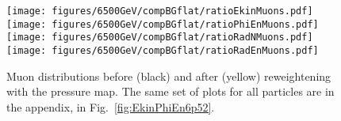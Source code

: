 \begin{figure}
\begin{center}

  \texttt{[image: figures/6500GeV/compBGflat/ratioEkinMuons.pdf]}
  \texttt{[image: figures/6500GeV/compBGflat/ratioPhiEnMuons.pdf]}
  \texttt{[image: figures/6500GeV/compBGflat/ratioRadNMuons.pdf]}
  \texttt{[image: figures/6500GeV/compBGflat/ratioRadEnMuons.pdf]}
\end{center}
\vspace{-0.6cm}
 \caption{Muon distributions before (black) and after (yellow) reweightening with the pressure map. The same set of plots for all particles are in the appendix, in Fig.~\ref{fig:EkinPhiEn6p52}.
  \label{fig:EkinPhiEn6p5}}
\end{figure}
